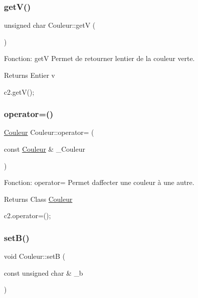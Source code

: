 \subsubsection{\texorpdfstring{get\+V()}{getV()}}
{\footnotesize\ttfamily unsigned char Couleur\+::getV (\begin{DoxyParamCaption}{ }\end{DoxyParamCaption})}



Fonction\+: getV Permet de retourner l\textquotesingle{}entier de la couleur verte. 

\begin{DoxyReturn}{Returns}
Entier v 
\begin{DoxyCode}
c2.getV();
\end{DoxyCode}
 
\end{DoxyReturn}
\mbox{\label{classCouleur_a939297e6a11ff80510d6acf02bfa3ac0}} 
\subsubsection{\texorpdfstring{operator=()}{operator=()}}
{\footnotesize\ttfamily \hyperlink{classCouleur}{Couleur} Couleur\+::operator= (\begin{DoxyParamCaption}\item[{const \hyperlink{classCouleur}{Couleur} \&}]{\+\_\+\+Couleur }\end{DoxyParamCaption})}



Fonction\+: operator= Permet d\textquotesingle{}affecter une couleur à une autre. 

\begin{DoxyReturn}{Returns}
Class \hyperlink{classCouleur}{Couleur} 
\begin{DoxyCode}
c2.operator=();
\end{DoxyCode}
 
\end{DoxyReturn}
\mbox{\label{classCouleur_ac598f1ad284ae2b59c5d781306ae9b0f}} 
\subsubsection{\texorpdfstring{set\+B()}{setB()}}
{\footnotesize\ttfamily void Couleur\+::setB (\begin{DoxyParamCaption}\item[{const unsigned char \&}]{\+\_\+b }\end{DoxyParamCaption})}




